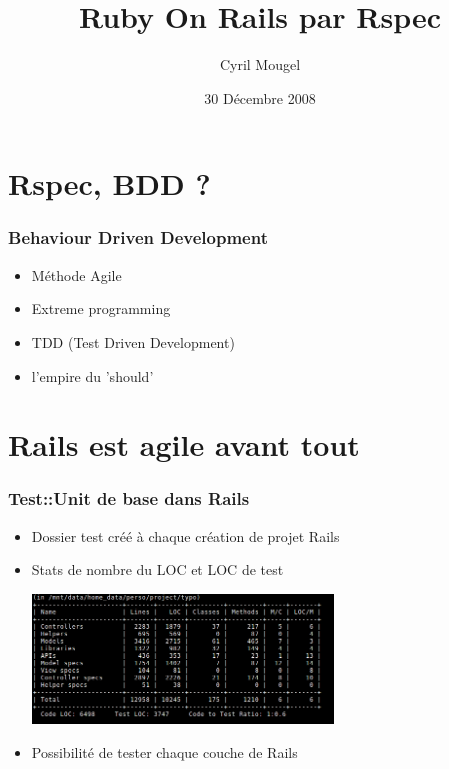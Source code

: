 \documentclass{beamer}
\date{30 Décembre 2008}
\title{Ruby On Rails par Rspec}
\author{Cyril Mougel}
\begin{document}
\begin{frame}
    \titlepage
\end{frame}

\section{Rspec, BDD ?}

\begin{frame}
	\frametitle{Behaviour Driven Development}
	\begin{itemize}
		\item M\'ethode Agile
		\item Extreme programming
		\item TDD (Test Driven Development)
        \item l'empire du 'should'
	\end{itemize}
\end{frame}

\section{Rails est agile avant tout}

\begin{frame}
    \frametitle{Test::Unit de base dans Rails}
    \begin{itemize}
        \item Dossier test cr\'e\'e \`a chaque cr\'eation de projet Rails
        \item Stats de nombre du LOC et LOC de test \\
            \begin{center}
                \includegraphics[width=80mm]{stats.png}     
            \end{center}
        \item Possibilité de tester chaque couche de Rails
    \end{itemize}
\end{frame}
\end{document}
